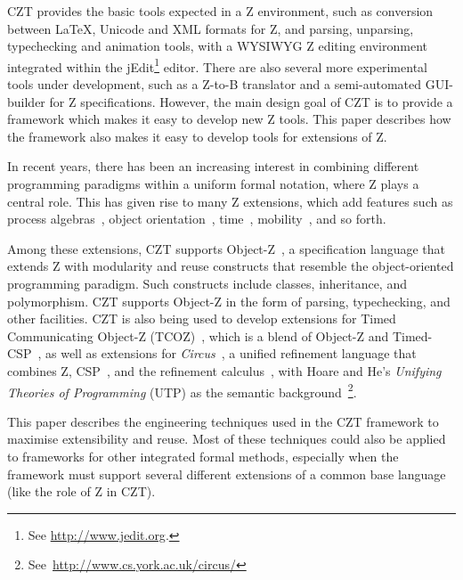 \documentclass{llncs}
\newcommand{\Circus}{{\sf\slshape Circus}}
\begin{document}
  CZT provides the basic tools expected in a Z environment, such as
  conversion between \LaTeX, Unicode and XML formats for Z, and
  parsing, unparsing, typechecking and animation tools, with a WYSIWYG
  Z editing environment integrated within the
  jEdit\footnote{See \url{http://www.jedit.org}.} editor.
  There are also several more experimental tools under development,
  such as a Z-to-B translator and a semi-automated GUI-builder for
  Z specifications.  However, the main design goal of CZT is to
  provide a framework which makes it easy to develop new Z tools.
  This paper describes how the framework also makes it easy to develop
  tools for extensions of Z.

  In recent years, there has been an increasing interest in combining
  different programming paradigms within a uniform formal notation,
  where Z plays a central role. This has given rise to many Z
  extensions, which add features such as
  process algebras~\cite{fischer-1998,fischer-2000,circus.sem:intro},
  object orientation~\cite{oz,ohcircus},
  time~\cite{tcoz,circus.sem:real.time2},
  mobility~\cite{circus.sem:mobility}, and so forth.

  Among these extensions, CZT supports Object-Z~\cite{oz}, a
  specification language that extends Z with modularity and reuse
  constructs that resemble the object-oriented programming
  paradigm. Such constructs include classes, inheritance, and
  polymorphism. CZT supports Object-Z in the form of parsing,
  typechecking, and other facilities.  CZT is also being used to
  develop extensions for Timed Communicating Object-Z (TCOZ)~\cite{tcoz},
  which is a blend of Object-Z and Timed-CSP~\cite{timed-csp}, as well
  as extensions for \Circus~\cite{circus.sem:intro}, a unified
  refinement language that combines Z, CSP~\cite{csp.books:roscoe},
  and the refinement calculus~\cite{fm.ref:morgan}, with Hoare and
  He's \textit{Unifying Theories of Programming} (UTP) as the semantic
  background~\cite{hoare.utp}\footnote{See~\url{http://www.cs.york.ac.uk/circus/}}.

  This paper describes the engineering techniques used in the CZT framework
  to maximise extensibility and reuse.
  Most of these techniques could also be applied to frameworks
  for other integrated formal methods, especially when the
  framework must support several different extensions of a common
  base language (like the role of Z in CZT).
\end{document}

